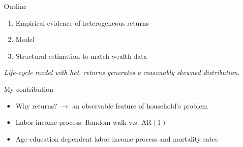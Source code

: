 \documentclass{beamer}
\begin{document}
\begin{frame}{Outline}
\begin{enumerate}
\item Empirical evidence of heterogeneous returns
\item Model
\item Structural estimation to match wealth data
\end{enumerate}

\vspace{2.5mm}
\textit{Life-cycle model with het. returns generates a reasonably skewned distribution.}


\end{frame}

\begin{frame}{My contribution}


\begin{itemize}
  \item Why returns? $\rightarrow$ an observable feature of household's problem
\item Labor income process: Random walk v.s. AR$(1)$
\item Age-education dependent labor income process and mortality rates
\end{itemize}
\end{frame}
\end{document}
